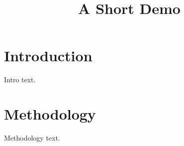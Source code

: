 \documentclass[article]{jss}
\title{A Short Demo}
\begin{document}
\section{Introduction}
Intro text.
\section{Methodology}
Methodology text.

\end{document}

